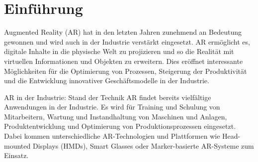 \section{Einführung}

Augmented Reality (AR) hat in den letzten Jahren zunehmend an Bedeutung
gewonnen und wird auch in der Industrie verstärkt eingesetzt. AR ermöglicht es,
digitale Inhalte in die physische Welt zu projizieren und so die Realität mit
virtuellen Informationen und Objekten zu erweitern. Dies eröffnet interessante
Möglichkeiten für die Optimierung von Prozessen, Steigerung der Produktivität
und die Entwicklung innovativer Geschäftsmodelle in der Industrie.

AR in der Industrie: Stand der Technik AR findet bereits vielfältige
Anwendungen in der Industrie. Es wird für Training und Schulung von
Mitarbeitern, Wartung und Instandhaltung von Maschinen und Anlagen,
Produktentwicklung und Optimierung von Produktionsprozessen eingesetzt. Dabei
kommen unterschiedliche AR-Technologien und Plattformen wie Head-mounted
Displays (HMDs), Smart Glasses oder Marker-basierte AR-Systeme zum Einsatz.